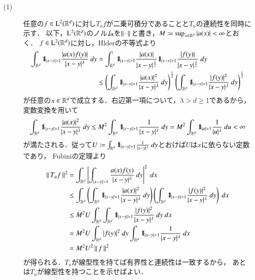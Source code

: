 	\begin{prf}\mbox{}
		\begin{description}
			\item[(1)] 
				任意の$f \in \mathrm{L}^2(\mathbb{R}^d)$に対し$T_a f$が二乗可積分であることと$T_a$の連続性を同時に示す．
				以下，$\mathrm{L}^2(\mathbb{R}^d)$のノルムを$\left\|\, \cdot\, \right\|_{}$と書き，$M \coloneqq \operatorname*{sup}_{x \in \mathbb{R}^d} |a(x)| < \infty$とおく．
				$f \in \mathrm{L}^2(\mathbb{R}^d)$に対し，Hlderの不等式より
				\begin{align}
					\int_{\mathbb{R}^d} \mbox{1}\hspace{-0.25em}\mbox{l}_{|x-y| > 1} \frac{|a(x)f(y)|}{|x-y|^\lambda}\ dy
					&= \int_{\mathbb{R}^d} \mbox{1}\hspace{-0.25em}\mbox{l}_{|x-y| > 1} \frac{|a(x)|}{|x-y|^{\frac{\lambda}{2}}} \mbox{1}\hspace{-0.25em}\mbox{l}_{|x-y| > 1} \frac{|f(y)|}{|x-y|^{\frac{\lambda}{2}}}\ dy \\
					&\leq \left( \int_{\mathbb{R}^d} \mbox{1}\hspace{-0.25em}\mbox{l}_{|x-y| > 1} \frac{|a(x)|^2}{|x-y|^{\lambda}}\ dy \right)^{\frac{1}{2}}
						\left( \int_{\mathbb{R}^d} \mbox{1}\hspace{-0.25em}\mbox{l}_{|x-y| > 1} \frac{|f(y)|^2}{|x-y|^{\lambda}}\ dy \right)^{\frac{1}{2}}
				\end{align}
				が任意の$x \in \mathbb{R}^d$で成立する．右辺第一項について，$\lambda > d \geq 1$であるから，変数変換を用いて
				\begin{align}
					\int_{\mathbb{R}^d} \mbox{1}\hspace{-0.25em}\mbox{l}_{|x-y| > 1} \frac{|a(x)|^2}{|x-y|^{\lambda}}\ dy
					\leq M^2 \int_{\mathbb{R}^d} \mbox{1}\hspace{-0.25em}\mbox{l}_{|x-y| > 1} \frac{1}{|x-y|^{\lambda}}\ dy
					= M^2 \int_{\mathbb{R}^d} \mbox{1}\hspace{-0.25em}\mbox{l}_{|u| > 1} \frac{1}{|u|^\lambda}\ du < \infty
				\end{align}
				が満たされる．従って$U \coloneqq \int_{\R^d} \defunc_{|x - y| > 1} \frac{1}{|x-y|^{\lambda}}\ dy$とおけば$U$は$x$に依らない定数であり，
				Fubiniの定理より
				\begin{align}
					\left\|\, T_a f\, \right\|_{}^2
					&= \int_{\mathbb{R}^d} \left| \int_{|x-y| > 1} \frac{a(x)f(y)}{|x-y|^\lambda}\ dy \right|^2\ dx \\
					&\leq \int_{\mathbb{R}^d} \left( \int_{\mathbb{R}^d} \mbox{1}\hspace{-0.25em}\mbox{l}_{|x-y| > 1} \frac{|a(x)|^2}{|x-y|^{\lambda}}\ dy \right)
						\left( \int_{\mathbb{R}^d} \mbox{1}\hspace{-0.25em}\mbox{l}_{|x-y| > 1} \frac{|f(y)|^2}{|x-y|^{\lambda}}\ dy \right)\ dx \\
					&\leq M^2 U \int_{\mathbb{R}^d} \int_{\mathbb{R}^d} \mbox{1}\hspace{-0.25em}\mbox{l}_{|x-y| > 1} \frac{|f(y)|^2}{|x-y|^{\lambda}}\ dy\ dx \\
					&= M^2 U \int_{\mathbb{R}^d} |f(y)|^2\ dy \int_{\mathbb{R}^d} \mbox{1}\hspace{-0.25em}\mbox{l}_{|x-y| > 1} \frac{1}{|x-y|^{\lambda}}\ dx \\
					&= M^2 U^2 \left\|\, f\, \right\|_{}^2
 				\end{align}
 				が得られる．$T_a$が線型性を持てば有界性と連続性は一致するから，
 				あとは$T_a$が線型性を持つことを示せばよい．
		\end{description}
	\end{prf}
	

